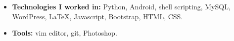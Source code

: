 \documentclass[10.1pt,a4paper,sans]{moderncv}        %
\begin{document}
\begin{itemize}

\item \textbf{Technologies I worked in:} Python, Android, shell scripting, MySQL, WordPress, LaTeX, Javascript, Bootstrap, HTML, CSS.

\item \textbf{Tools:} vim editor, git, Photoshop.
\end{itemize}

\nocite{*}



\end{document}
